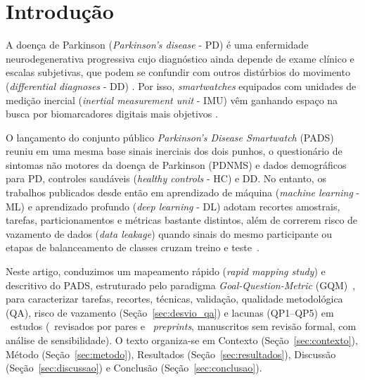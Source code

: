 \section{Introdução}

A doença de Parkinson (\textit{Parkinson's disease} - PD) é uma enfermidade
neurodegenerativa progressiva cujo diagnóstico ainda depende de exame clínico e
escalas subjetivas, que podem se confundir com outros distúrbios do movimento
(\textit{differential diagnoses} - DD) \cite{varghese_machine_2024}. Por isso,
\textit{smartwatches} equipados com unidades de medição inercial
(\textit{inertial measurement unit} - IMU) vêm ganhando espaço na busca por
biomarcadores digitais mais objetivos \cite{ouabd_overview_2026}.

O lançamento do conjunto público \textit{Parkinson's Disease Smartwatch} (PADS)
\cite{varghese_machine_2024} reuniu em uma mesma base sinais inerciais dos dois
punhos, o questionário de sintomas não motores da doença de Parkinson (PDNMS) e
dados demográficos para PD, controles saudáveis (\textit{healthy controls} - HC)
e DD. No entanto,
os trabalhos publicados desde então em aprendizado de máquina (\textit{machine
learning} - ML) e aprendizado profundo (\textit{deep learning} - DL) adotam
recortes amostrais, tarefas, particionamentos e métricas bastante distintos,
além de correrem risco de vazamento de dados (\textit{data leakage}) quando
sinais do mesmo participante ou etapas de balanceamento de classes cruzam treino
e teste~\cite{djemaa_quantifying_2026,pinto_neto_machine_2026}.

Neste artigo, conduzimos um mapeamento rápido (\textit{rapid mapping study}) e
descritivo do PADS, estruturado pelo paradigma \textit{Goal-Question-Metric}
(GQM)~\cite{fernandes_interoperability_2018}, para caracterizar tarefas, recortes,
técnicas, validação, qualidade metodológica (QA), risco de vazamento
(Seção~\ref{sec:desvio_qa}) e lacunas (QP1--QP5) em \nTotal\ estudos
(\nRevisadosPares\ revisados por pares e \nPreprints\ \textit{preprints},
manuscritos sem revisão formal, com análise de sensibilidade). O texto organiza-se em Contexto (Seção~\ref{sec:contexto}),
Método (Seção~\ref{sec:metodo}), Resultados (Seção~\ref{sec:resultados}),
Discussão (Seção~\ref{sec:discussao}) e Conclusão (Seção~\ref{sec:conclusao}).
